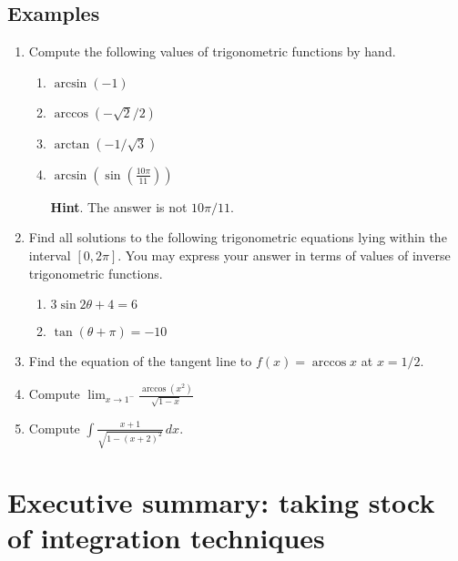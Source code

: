 
\subsection*{Examples}

\begin{enumerate}
  \item Compute the following values of trigonometric functions by hand.
  \begin{enumerate}
    \item $\displaystyle\arcsin(-1)$
    \item $\displaystyle\arccos(-\sqrt{2}/2)$
    \item $\displaystyle\arctan(-1/\sqrt{3})$
    \item $\displaystyle\arcsin\left(\sin\left(\frac{10\pi}{11}\right)\right)$

    {\bf Hint}. The answer is not $10\pi/11$.
  \end{enumerate}
  \item Find all solutions to the following trigonometric equations lying within the interval $[0,2\pi]$. You may express your answer in terms of values of inverse trigonometric functions.
  \begin{enumerate}
    \item $\displaystyle 3\sin 2\theta +4=6$
    \item $\displaystyle \tan (\theta+\pi)=-10$
  \end{enumerate}
  \item Find the equation of the tangent line to $f(x)=\arccos x $ at $x=1/2$.

  \item Compute $\displaystyle\lim_{x\rightarrow 1^{-}}\frac{\arccos(x^2)}{\sqrt{1-x}}$

  \item Compute $\displaystyle\int \frac{x+1}{\sqrt{1-(x+2)^2}}\, dx$.
\end{enumerate}



\newpage

\section{Executive summary: taking stock of integration techniques}

